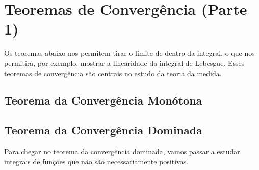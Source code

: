 







\section{Teoremas de Convergência (Parte 1)}

Os teoremas abaixo nos permitem tirar o limite de dentro da integral, o que nos permitirá, por exemplo, mostrar a linearidade da integral de Lebesgue. Esses teoremas de convergência são centrais no estudo da teoria da medida.
\subsection{Teorema da Convergência Monótona}

\MCT
\fatou

\subsection{Teorema da Convergência Dominada}

Para chegar no teorema da convergência dominada, vamos passar a estudar integrais de funções que não são necessariamente positivas.

\integralIsZeroIffFunctionIsZeroAlmostEverywhere

\functionIsIntegrableIffAbsoluteValueIs

\integralIsLinear

\dominatedFunctionIsIntegrable

\DCT

\DCTAlmostEverywhere